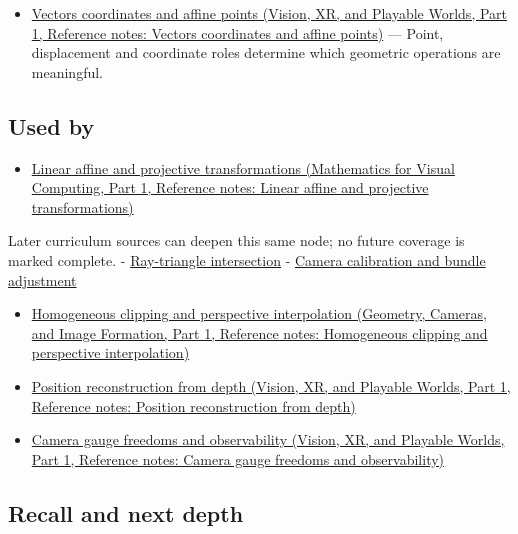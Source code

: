 \begin{itemize}
\tightlist
\item
  \href{../07-Vision-XR-and-Playable-Worlds-P01/main.pdf\#appendix-0659864c0aa3}{Vectors coordinates and affine points (Vision, XR, and Playable Worlds, Part 1, Reference notes: Vectors coordinates and affine points)} --- Point, displacement and coordinate roles determine which geometric operations are meaningful.
\end{itemize}

\subsection{Used by}\label{appendix-cb3b26862282-used-by}

\hypertarget{appendix-cb3b26862282-used-by}{}

\begin{itemize}
\tightlist
\item
  \href{../02-Mathematics-for-Visual-Computing-P01/main.pdf\#appendix-0bf0ca73f735}{Linear affine and projective transformations (Mathematics for Visual Computing, Part 1, Reference notes: Linear affine and projective transformations)}
\end{itemize}

Later curriculum sources can deepen this same node; no future coverage is marked complete. - \hyperref[appendix-47ac1bd6d144]{Ray-triangle intersection} - \hyperref[appendix-3ee9861904d5]{Camera calibration and bundle adjustment}

\begin{itemize}
\tightlist
\item
  \href{../03-Geometry-Cameras-and-Image-Formation-P01/main.pdf\#appendix-40426e4b2103}{Homogeneous clipping and perspective interpolation (Geometry, Cameras, and Image Formation, Part 1, Reference notes: Homogeneous clipping and perspective interpolation)}
\item
  \href{../07-Vision-XR-and-Playable-Worlds-P01/main.pdf\#appendix-2cbf2968e866}{Position reconstruction from depth (Vision, XR, and Playable Worlds, Part 1, Reference notes: Position reconstruction from depth)}
\item
  \href{../07-Vision-XR-and-Playable-Worlds-P01/main.pdf\#appendix-113f0267e5f4}{Camera gauge freedoms and observability (Vision, XR, and Playable Worlds, Part 1, Reference notes: Camera gauge freedoms and observability)}
\end{itemize}

\subsection{Recall and next depth}\label{appendix-cb3b26862282-recall-and-next-depth}


